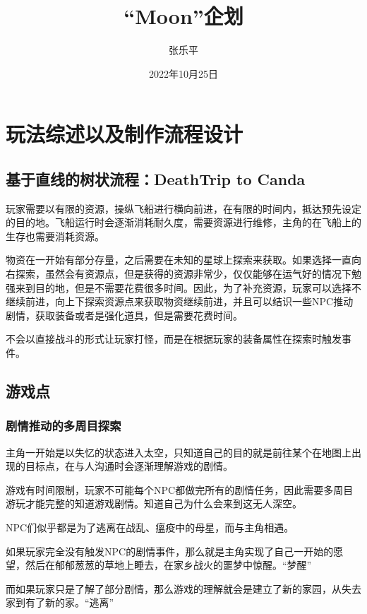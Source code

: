 \documentclass{ctexart}
\begin{document}
	\title{“Moon”企划}
	\author{张乐平}
	\date{2022年10月25日}
	\maketitle

	\tableofcontents
	\newpage
	\section{玩法综述以及制作流程设计}
		\subsection{基于直线的树状流程：DeathTrip to Canda}
		玩家需要以有限的资源，操纵飞船进行横向前进，在有限的时间内，抵达预先设定的目的地。飞船运行时会逐渐消耗耐久度，需要资源进行维修，主角的在飞船上的生存也需要消耗资源。

		物资在一开始有部分存量，之后需要在未知的星球上探索来获取。如果选择一直向右探索，虽然会有资源点，但是获得的资源非常少，仅仅能够在运气好的情况下勉强来到目的地，但是不需要花费很多时间。因此，为了补充资源，玩家可以选择不继续前进，向上下探索资源点来获取物资继续前进，并且可以结识一些NPC推动剧情，获取装备或者是强化道具，但是需要花费时间。
		
		不会以直接战斗的形式让玩家打怪，而是在根据玩家的装备属性在探索时触发事件。
		\subsection{游戏点}
			\subsubsection{剧情推动的多周目探索}
		主角一开始是以失忆的状态进入太空，只知道自己的目的就是前往某个在地图上出现的目标点，在与人沟通时会逐渐理解游戏的剧情。	
		
		游戏有时间限制，玩家不可能每个NPC都做完所有的剧情任务，因此需要多周目游玩才能完整的知道游戏剧情。知道自己为什么会来到这无人深空。
		
		NPC们似乎都是为了逃离在战乱、瘟疫中的母星，而与主角相遇。
				
		如果玩家完全没有触发NPC的剧情事件，那么就是主角实现了自己一开始的愿望，然后在郁郁葱葱的草地上睡去，在家乡战火的噩梦中惊醒。“梦醒”
		
		而如果玩家只是了解了部分剧情，那么游戏的理解就会是建立了新的家园，从失去家到有了新的家。“逃离”
		
\end{document}
